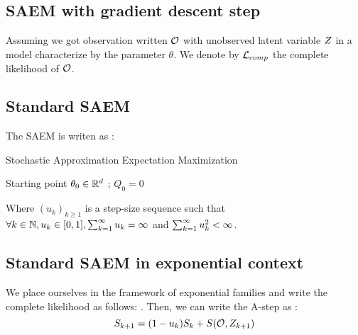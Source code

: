 \documentclass[a4paper]{article}
\begin{document}
 
\begin{myText}

\section{SAEM with gradient descent step}

Assuming we got observation written $\mathcal O$ with unobserved latent variable $Z$ in a model characterize by the parameter $\theta$. We denote by $\mathcal L_{comp}$ the complete likelihood of $\mathcal O$.

\subsection{Standard SAEM}

The SAEM is writen as : 

\begin{myAlgorithm}[13cm]
    \caption{Stochastic Approximation Expectation Maximization}
    \Initialize Starting point $\theta_0 \in \mathbb R^d$ ; $Q_0 = 0$
    
\end{myAlgorithm}

Where $(u_k)_{k\geq 1}$ is a step-size sequence such that $\forall k \in \mathbb N, u_k \in [0,1], \sum_{k=1} ^{\infty} u_k= \infty$ and $\sum_{k=1} ^{\infty} u_k^2< \infty$.

\subsection{Standard SAEM in exponential context}

We place ourselves in the framework of exponential families and write the complete likelihood as follows: . Then, we can write the A-step as : 
$$S_{k+1} = (1-u_k) S_k + S(\mathcal O, Z_{k+1})$$


\end{myText}
\end{document}
